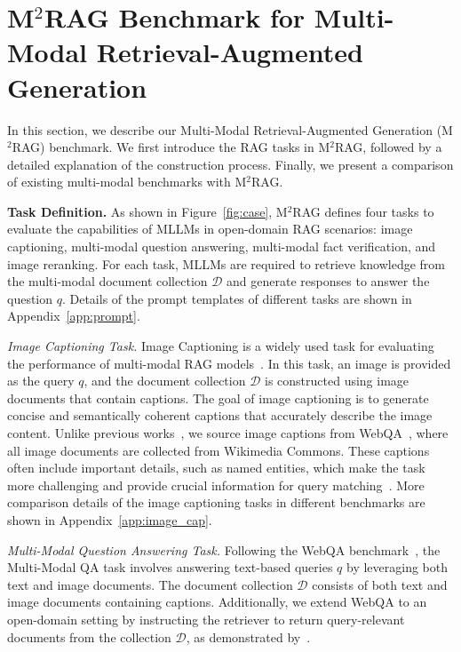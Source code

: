 \section{M$^2$RAG Benchmark for Multi-Modal Retrieval-Augmented Generation} In this section, we describe our Multi-Modal Retrieval-Augmented Generation (M$^2$RAG) benchmark. We first introduce the RAG tasks in M$^2$RAG, followed by a detailed explanation of the construction process. Finally, we present a comparison of existing multi-modal benchmarks with M$^2$RAG.

\textbf{Task Definition.}\label{bench:task} As shown in Figure~\ref{fig:case}, M$^2$RAG defines four tasks to evaluate the capabilities of MLLMs in open-domain RAG scenarios: image captioning, multi-modal question answering, multi-modal fact verification, and image reranking. For each task, MLLMs are required to retrieve knowledge from the multi-modal document collection $\mathcal{D}$ and generate responses to answer the question $q$. Details of the prompt templates of different tasks are shown in Appendix~\ref{app:prompt}.

\textit{Image Captioning Task.} Image Captioning is a widely used task for evaluating the performance of multi-modal RAG models~\cite{aghajanyan2022cm3, sharifymoghaddam2024unirag}. In this task, an image is provided as the query $q$, and the document collection $\mathcal{D}$ is constructed using image documents that contain captions. The goal of image captioning is to generate concise and semantically coherent captions that accurately describe the image content. Unlike previous works~\cite{aghajanyan2022cm3, sharifymoghaddam2024unirag}, we source image captions from WebQA~\cite{chang2022webqa}, where all image documents are collected from Wikimedia Commons. These captions often include important details, such as named entities, which make the task more challenging and provide crucial information for query matching~\cite{liu2022universal}. More comparison details of the image captioning tasks in different benchmarks are shown in Appendix~\ref{app:image_cap}.


\textit{Multi-Modal Question Answering Task.} Following the WebQA benchmark~\cite{chang2022webqa}, the Multi-Modal QA task involves answering text-based queries $q$ by leveraging both text and image documents. The document collection $\mathcal{D}$ consists of both text and image documents containing captions. Additionally, we extend WebQA to an open-domain setting by instructing the retriever to return query-relevant documents from the collection $\mathcal{D}$, as demonstrated by~\citet{liu2022universal}.

